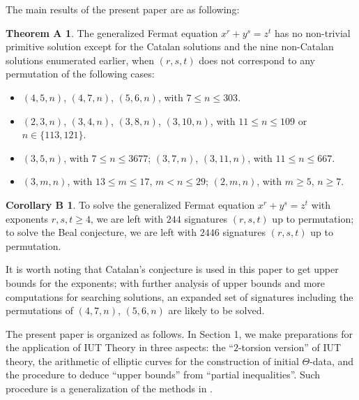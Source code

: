 \documentclass[a4paper, 12pt]{article}
\numberwithin{equation}{section}
\theoremstyle{definition}
\newtheorem*{thm-A}{Theorem A}
\newtheorem*{cor-B}{Corollary B}
\begin{document}
The main results of the present paper are as following:
\begin{thm-A}
The generalized Fermat equation $x^r + y^s = z^t$ has no non-trivial primitive solution except for the Catalan solutions and the nine non-Catalan solutions enumerated earlier, when $(r, s, t)$ does not correspond to any permutation of the following cases:
\begin{itemize}
\item $(4,5,n)$, $(4,7,n)$, $(5,6,n)$, with $7 \le n \le 303$.
\item $(2,3,n)$, $(3,4,n)$, $(3,8,n)$, $(3,10,n)$, with $11\le n \le 109$ or $n\in \{113, 121\}$.
\item $(3,5,n)$, with $7\le n \le 3677$; $(3,7,n)$, $(3,11,n)$, with $11 \le n \le 667$.
\item $(3,m,n)$, with $13 \le m \le 17$, $m < n \le 29$; $(2,m,n)$, with $m \ge 5$, $n\ge 7$.
\end{itemize}
\end{thm-A}

\begin{cor-B}
To solve the generalized Fermat equation $x^r + y^s = z^t$ with exponents $r,s,t \ge 4$, we are left with $244$ signatures $(r,s,t)$ up to permutation;
to solve the Beal conjecture, we are left with $2446$ signatures $(r,s,t)$ up to permutation.
\end{cor-B}

It is worth noting that Catalan's conjecture is used in this paper to get upper bounds for the exponents; with further analysis of upper bounds and more computations for searching solutions, an expanded set of signatures including the permutations of $(4, 7, n)$, $(5, 6, n)$ are likely to be solved.



The present paper is organized as follows. In Section 1, we make preparations for the application of IUT Theory in three aspects: the ``$2$-torsion version'' of IUT theory, the arithmetic of elliptic curves for the construction of initial $\Theta$-data, and the procedure to deduce ``upper bounds'' from ``partial inequalities''. 
Such procedure is a generalization of the methods in \cite{Diophantine_after_IUT_I}.
\end{document}
